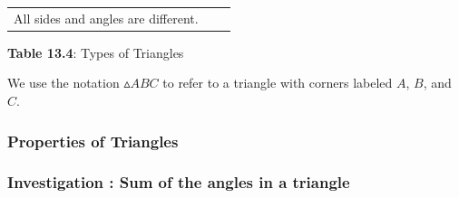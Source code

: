 \begin{table}[H]
\begin{center}
\begin{xtabular*}{\mytablewidth}[t]{|p{10\mystarwidth}|p{10\mystarwidth}|p{10\mystarwidth}|}
        All sides and angles are different.%
     \tabularnewline{}
    \end{xtabular*}
      \end{center}
    \begin{center}{\small\bfseries Table 13.4}: Types of Triangles\end{center}
    
    \addtocounter{footnote}{-0}
    
    \par
  
        \label{m38380*id317683}We use the notation \begin{math}▵ABC\end{math} to refer to a triangle with corners labeled \begin{math}A\end{math}, \begin{math}B\end{math}, and \begin{math}C\end{math}.\par 
        \label{m38380*uid40}
        \subsubsection{ Properties of Triangles}
        \nopagebreak
        
          
\label{m38380*secfhsst!!!underscore!!!id655}
        \subsubsection{  Investigation : Sum of the angles in a triangle }
        \nopagebreak
        

\end{table}
